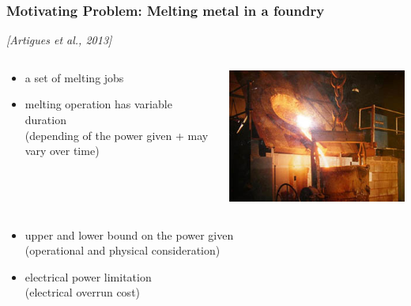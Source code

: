 \begin{frame}
  \frametitle{Motivating Problem: Melting metal in a foundry}
  {\small \it \color{gray!50!black!50} [Artigues et al., 2013]}
  \vfill
  \begin{columns}
    \begin{column}{0.5\linewidth}
      \begin{itemize}
      \item a set of melting jobs
        \vspace{0.4cm}
      \item melting operation has variable duration\\
        {\small (depending of the power given + may vary over time)}
         \vspace{0.4cm}
      \end{itemize}     
    \end{column}
    \hfill 
    \begin{column}{0.4\linewidth}
      \includegraphics[width=0.8\linewidth]{figures/induction.jpg}
    \end{column}
  \end{columns}
  \vfill
  \begin{itemize}
  \item upper and lower bound on the power given \\
    {\small(operational and physical consideration)}
    \vspace{0.4cm}
  \item electrical power limitation\\
    {\small(electrical overrun cost)}
  \end{itemize}
\end{frame}

